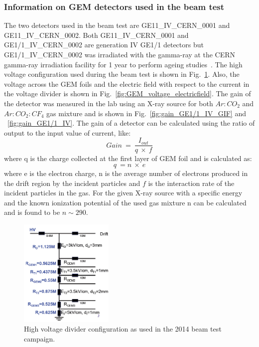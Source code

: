 \subsubsection{Information on GEM detectors used in the beam test} %
\label{ssub:information_of_gem_detectors_used_in_test_beam}
The two detectors used in the beam test are GE11\_IV\_CERN\_0001 and \\GE11\_IV\_CERN\_0002. 
Both GE11\_IV\_CERN\_0001 and GE1/1\_IV\_CERN\_0002 are generation IV GE1/1 detectors but GE1/1\_IV\_CERN\_0002 was irradiated with the gamma-ray at the CERN gamma-ray irradiation facility for 1 year to perform ageing studies~\cite{Merlin2013}. 
The high voltage configuration used during the beam test is shown in Fig.~\ref{fig:HV_configuration}. 
Also, the voltage across the GEM foils and  the electric field  with respect to the current in the voltage divider is shown in Fig.~\ref{fig:GEM_voltage_electricfield}. 
The gain of the detector was measured in the lab using an X-ray source for both $Ar:CO_2$ and
 $Ar:CO_2:CF_4$ gas mixture and is shown in Fig.~\ref{fig:gain_GE1/1_IV_GIF} and ~\ref{fig:gain_GE1/1_IV}. 
The gain of a detector can be calculated using the ratio of output to the input value of current, like:
\begin{equation}
    Gain~=~\frac{I_{out}}{q~\times~f}
\end{equation}
where q is the charge collected at the first layer of GEM foil and is calculated as:
\begin{equation}
    q~= n~\times~e
\end{equation}
where e is the electron charge, n is the average number of electrons produced in the drift region by the incident particles and $f$ is the interaction rate of the incident particles in the gas. For the given X-ray source with a specific energy and the known ionization potential of the used gas mixture n can be calculated and is found to be $n \sim 290$.
\begin{figure}[htbp]
    \centering
    \includegraphics[width=0.40\textwidth]{figures/GEM/HV_divider_gem_testbeam_2014.jpeg}
    \caption{High voltage divider configuration as used in the 2014 beam test campaign.}
    \label{fig:HV_configuration}
\end{figure}

